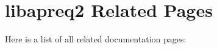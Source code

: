 \section{libapreq2 Related Pages}
Here is a list of all related documentation pages:\begin{CompactList}
\item {}

\item {}

\item {}

\item {}

\end{CompactList}

